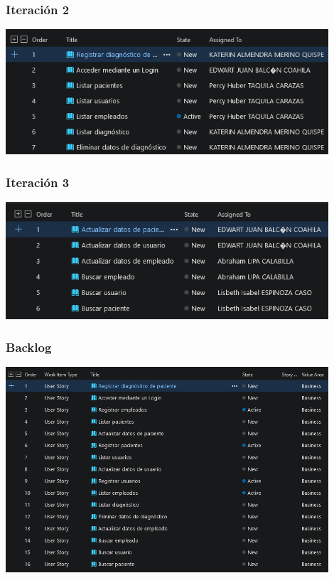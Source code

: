 \documentclass[preprint,12pt,notitlepage]{elsarticle}
\begin{document}
	\subsubsection{Iteración 2}
	\begin{center}
	\includegraphics[width=12cm]{./imagen/Screenshot_6.png} 
	\end{center}
	\subsubsection{Iteración 3}
	\begin{center}
	\includegraphics[width=12cm]{./imagen/Screenshot_5.png}
	\end{center}

	\subsubsection{Backlog}
	\begin{center}
	\includegraphics[width=12cm]{./imagen/Screenshot_8.png}
	\end{center}
\end{document}
